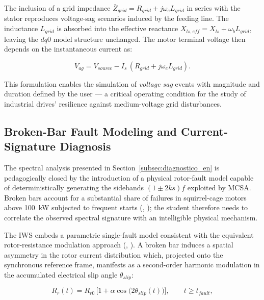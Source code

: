 \documentclass[a4paper]{ifacconf}
\begin{document}
The inclusion of a grid impedance $\bar{Z}_{grid} = R_{grid} + j\omega_e L_{grid}$ in series with the stator reproduces voltage-sag scenarios induced by the feeding line. The inductance $L_{grid}$ is absorbed into the effective reactance $X_{ls,eff} = X_{ls} + \omega_b L_{grid}$, leaving the $dq0$ model structure unchanged. The motor terminal voltage then depends on the instantaneous current as:

\begin{equation}
\label{eq:vag_grid_en}
\bar{V}_{ag} = \bar{V}_{source} - \bar{I}_s\,(R_{grid} + j\omega_e L_{grid}).
\end{equation}

\noindent This formulation enables the simulation of \textit{voltage sag} events with magnitude and duration defined by the user --- a critical operating condition for the study of industrial drives' resilience against medium-voltage grid disturbances.

\subsection{Broken-Bar Fault Modeling and Current-Signature Diagnosis}
\label{subsec:broken_bar_en}

The spectral analysis presented in Section~\ref{subsec:diagnostico_en} is pedagogically closed by the introduction of a physical rotor-fault model capable of deterministically generating the sidebands $(1 \pm 2ks)f$ exploited by MCSA. Broken bars account for a substantial share of failures in squirrel-cage motors above 100~kW subjected to frequent starts (\citeauthor{arkan2005modelling}, \citeyear{arkan2005modelling}); the student therefore needs to correlate the observed spectral signature with an intelligible physical mechanism.

The IWS embeds a parametric single-fault model consistent with the equivalent rotor-resistance modulation approach (\citeauthor{tuanmohamad2024advance}, \citeyear{tuanmohamad2024advance}). A broken bar induces a spatial asymmetry in the rotor current distribution which, projected onto the synchronous reference frame, manifests as a second-order harmonic modulation in the accumulated electrical slip angle $\theta_{slip}$:

\begin{equation}
\label{eq:broken_bar_en}
R_r(t) = R_{r0}\,\bigl[1 + \alpha\cos\!\bigl(2\theta_{slip}(t)\bigr)\bigr], \qquad t \geq t_{fault},
\end{equation}
\end{document}
